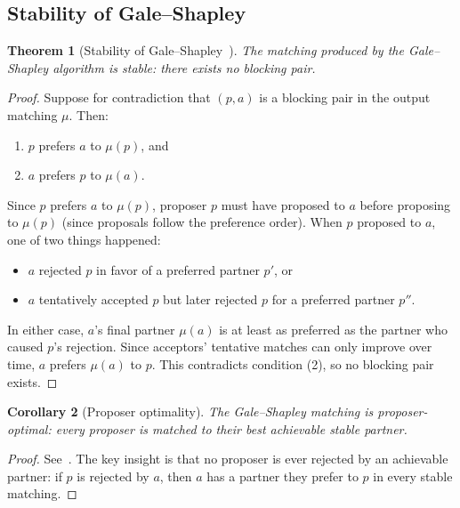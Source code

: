 \documentclass[10pt]{article}
\newtheorem{theorem}{Theorem}
\newtheorem{corollary}[theorem]{Corollary}
\begin{document}
\subsection{Stability of Gale--Shapley}
\label{app:proof-gs}

\begin{theorem}[Stability of Gale--Shapley~\citep{gale1962college}]
The matching produced by the Gale--Shapley algorithm is stable: there exists no blocking pair.
\end{theorem}

\begin{proof}
Suppose for contradiction that $(p, a)$ is a blocking pair in the output matching $\mu$. Then:
\begin{enumerate}
  \item $p$ prefers $a$ to $\mu(p)$, and
  \item $a$ prefers $p$ to $\mu(a)$.
\end{enumerate}

Since $p$ prefers $a$ to $\mu(p)$, proposer $p$ must have proposed to $a$ before proposing to $\mu(p)$ (since proposals follow the preference order). When $p$ proposed to $a$, one of two things happened:
\begin{itemize}
  \item $a$ rejected $p$ in favor of a preferred partner $p'$, or
  \item $a$ tentatively accepted $p$ but later rejected $p$ for a preferred partner $p''$.
\end{itemize}

In either case, $a$'s final partner $\mu(a)$ is at least as preferred as the partner who caused $p$'s rejection. Since acceptors' tentative matches can only improve over time, $a$ prefers $\mu(a)$ to $p$. This contradicts condition (2), so no blocking pair exists.
\end{proof}

\begin{corollary}[Proposer optimality]
The Gale--Shapley matching is proposer-optimal: every proposer is matched to their best achievable stable partner.
\end{corollary}

\begin{proof}
See~\citet{gale1962college}. The key insight is that no proposer is ever rejected by an achievable partner: if $p$ is rejected by $a$, then $a$ has a partner they prefer to $p$ in every stable matching.
\end{proof}
\end{document}
